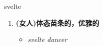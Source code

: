 
\begin{frame}
{\huge svelte}
\begin{center}
\begin{enumerate}\Large
  \item \textbf{(女人)体态苗条的，优雅的}
  \begin{itemize}
    \item \em{\Large{svelte dancer}}
  \end{itemize}
\end{enumerate}
\end{center}
\end{frame}
